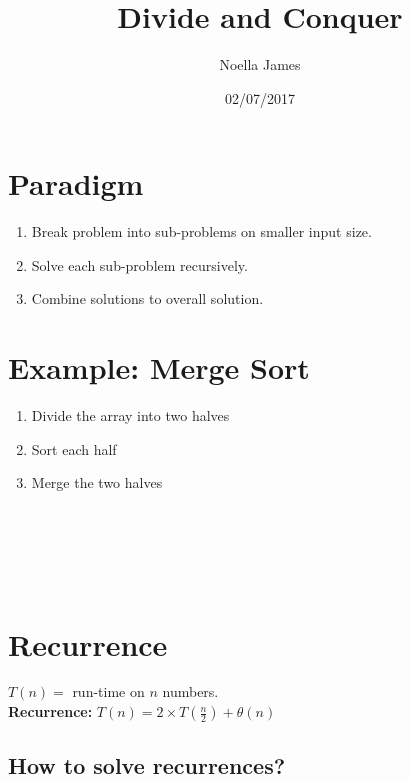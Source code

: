 \documentclass{article}
\theoremstyle{definition}
\theoremstyle{remark}
\theoremstyle{plain}
\begin{document}
\title{Divide and Conquer}
\date{02/07/2017}
\author{Noella James}
\maketitle

\section{Paradigm}

\begin{enumerate}
\item Break problem into sub-problems on smaller input size.
\item Solve each sub-problem recursively.
\item Combine solutions to overall solution.
\end{enumerate}

\section{Example: Merge Sort}


\begin{enumerate}
\item Divide the array into two halves
\item Sort each half
\item Merge the two halves
\end{enumerate}

\mbox{      }
 \\\\
\\\\

\section{Recurrence}

$T(n) =$ run-time on $n$ numbers.\\
\textbf{Recurrence:} $T(n) = 2 \times T(\frac{n}{2}) + \theta(n)$\\


\subsection{How to solve recurrences?}
\end{document}
